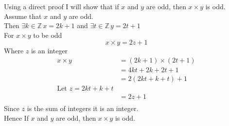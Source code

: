 \documentclass[12pt letter]{report}
\begin{document}

\begin{myproof}
	Using a direct proof I will show that if $x$ and $y$ are odd, then $x \times  y$ is odd.\\
	Assume that $x$ and $y$ are odd.\\
	Then $\exists k \in \mathbb{Z} \, x = 2k + 1 $ and $\exists t \in \mathbb{Z} \, y = 2t + 1$\\
	For $x \times y$ to be odd
	\[
		x \times y = 2z + 1
	\]
	Where $z$ is an integer\\
	\begin{align*}
		x \times y & = \left( 2k + 1 \right) \times \left( 2t + 1 \right) \\
		           & = 4kt + 2k + 2t + 1                                  \\
		           & = 2(2kt + k + t) + 1                                 \\
		\text{Let } z = 2kt + k + t                                       \\
		           & = 2z + 1                                             \\
	\end{align*}
	Since $z$ is the sum of integers it is an integer.\\
	Hence If $x$ and $y$ are odd, then $x \times y$ is odd.
\end{myproof}
\end{document}
